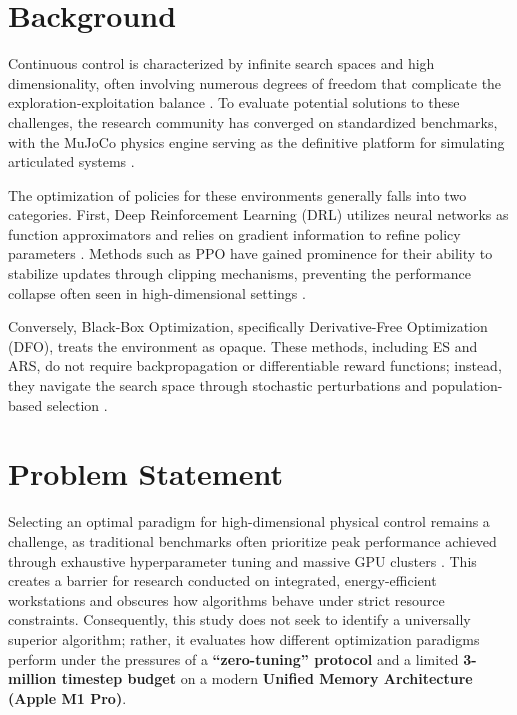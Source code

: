 \section{Background}
 
Continuous control is characterized by infinite search spaces and high dimensionality, often involving numerous degrees of freedom that complicate the exploration-exploitation balance \citep{wang2017continuous}. To evaluate potential solutions to these challenges, the research community has converged on standardized benchmarks, with the MuJoCo physics engine serving as the definitive platform for simulating articulated systems \citep{towers2024gymnasium}.

The optimization of policies for these environments generally falls into two categories. First, Deep Reinforcement Learning (DRL) utilizes neural networks as function approximators and relies on gradient information to refine policy parameters \citep{sutton2018rl}. Methods such as PPO have gained prominence for their ability to stabilize updates through clipping mechanisms, preventing the performance collapse often seen in high-dimensional settings \citep{schulman2017ppo}. 

Conversely, Black-Box Optimization, specifically Derivative-Free Optimization (DFO), treats the environment as opaque. These methods, including ES and ARS, do not require backpropagation or differentiable reward functions; instead, they navigate the search space through stochastic perturbations and population-based selection \citep{eiben2015ec,salimans2017es}.

\section{Problem Statement}

Selecting an optimal paradigm for high-dimensional physical control remains a challenge, as traditional benchmarks often prioritize peak performance achieved through exhaustive hyperparameter tuning and massive GPU clusters \citep{strubell2019energy}. This creates a barrier for research conducted on integrated, energy-efficient workstations and obscures how algorithms behave under strict resource constraints. Consequently, this study does not seek to identify a universally superior algorithm; rather, it evaluates how different optimization paradigms perform under the pressures of a \textbf{“zero-tuning” protocol} and a limited \textbf{3-million timestep budget} on a modern \textbf{Unified Memory Architecture (Apple M1 Pro)}.

